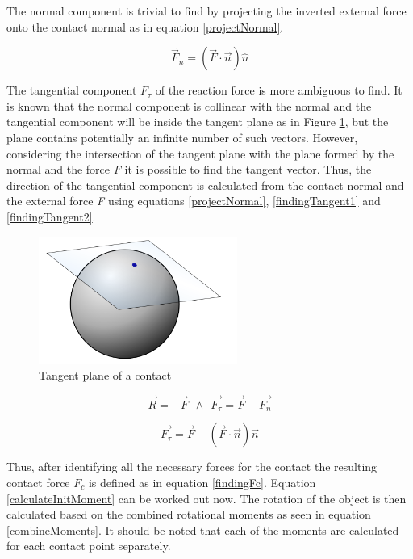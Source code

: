 The normal component is trivial to find by projecting the inverted external force onto the contact normal as in equation \ref{projectNormal}.

\begin{equation}
\label{projectNormal}
\vec{F}_n = (\vec{F} \cdot \vec{n})\widehat{n}
\end{equation}

The tangential component $F_{\tau}$ of the reaction force is more ambiguous to find. It is known that the normal component is collinear with the normal and the tangential component will be inside the tangent plane as in Figure \ref{tangentFig}, but the plane contains potentially an infinite number of such vectors. However, considering the intersection of the tangent plane with the plane formed by the normal and the force \emph{F} it is possible to find the tangent vector. Thus, the direction of the tangential component is calculated from the contact normal and the external force \emph{F} using equations \ref{projectNormal},  \ref{findingTangent1} and \ref{findingTangent2}.

\begin{figure}
\begin{center}
\includegraphics[width=65mm]{sections/methodology/images/basic/tangentspace.png}
\caption[Tangent plane of a contact]{\label{tangentFig} Tangent plane of a contact \citep{Pal2001}}
\end{center}
\end{figure}

\begin{equation}
\label{findingTangent1}
\vec{R}=-\vec{F} ~~ \wedge   ~~\vec{F_{\tau}}=\vec{F}-\vec{F_{n}}
\end{equation}

\begin{equation}
\label{findingTangent2}
\vec{F_{\tau}}=\vec{F}-(\vec{F} \cdot \vec{n})\vec n
\end{equation}

Thus, after identifying all the necessary forces for the contact the resulting contact force $F_c$ is defined as in equation \ref{findingFc}. Equation \ref {calculateInitMoment} can be worked out now. The rotation of the object is then calculated based on the combined rotational moments as seen in equation \ref{combineMoments}. It should be noted that each of the moments are calculated for each contact point separately.

